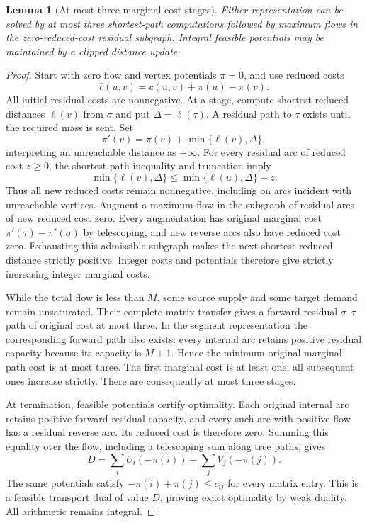 \documentclass[11pt]{article}
\newtheorem{lemma}[theorem]{Lemma}
\theoremstyle{remark}
\begin{document}
\begin{lemma}[At most three marginal-cost stages]\label{lem:stages}
Either representation can be solved by at most three shortest-path computations followed by maximum flows in the zero-reduced-cost residual subgraph. Integral feasible potentials may be maintained by a clipped distance update.
\end{lemma}
\begin{proof}
Start with zero flow and vertex potentials $\pi=0$, and use reduced costs
\[
 \widehat c(u,v)=c(u,v)+\pi(u)-\pi(v).
\]
All initial residual costs are nonnegative. At a stage, compute shortest reduced distances $\ell(v)$ from $\sigma$ and put $\Delta=\ell(\tau)$. A residual path to $\tau$ exists until the required mass is sent. Set
\[
 \pi'(v)=\pi(v)+\min\{\ell(v),\Delta\},
\]
interpreting an unreachable distance as $+\infty$. For every residual arc of reduced cost $z\ge0$, the shortest-path inequality and truncation imply
\[
 \min\{\ell(v),\Delta\}\le
 \min\{\ell(u),\Delta\}+z.
\]
Thus all new reduced costs remain nonnegative, including on arcs incident with unreachable vertices. Augment a maximum flow in the subgraph of residual arcs of new reduced cost zero. Every augmentation has original marginal cost $\pi'(\tau)-\pi'(\sigma)$ by telescoping, and new reverse arcs also have reduced cost zero. Exhausting this admissible subgraph makes the next shortest reduced distance strictly positive. Integer costs and potentials therefore give strictly increasing integer marginal costs.

While the total flow is less than $M$, some source supply and some target demand remain unsaturated. Their complete-matrix transfer gives a forward residual $\sigma$--$\tau$ path of original cost at most three. In the segment representation the corresponding forward path also exists: every internal arc retains positive residual capacity because its capacity is $M+1$. Hence the minimum original marginal path cost is at most three. The first marginal cost is at least one; all subsequent ones increase strictly. There are consequently at most three stages.

At termination, feasible potentials certify optimality. Each original internal arc retains positive forward residual capacity, and every such arc with positive flow has a residual reverse arc. Its reduced cost is therefore zero. Summing this equality over the flow, including a telescoping sum along tree paths, gives
\[
 D=\sum_i U_i(-\pi(i))-\sum_j V_j(-\pi(j)).
\]
The same potentials satisfy $-\pi(i)+\pi(j)\le c_{ij}$ for every matrix entry. This is a feasible transport dual of value $D$, proving exact optimality by weak duality. All arithmetic remains integral.
\end{proof}
\end{document}
